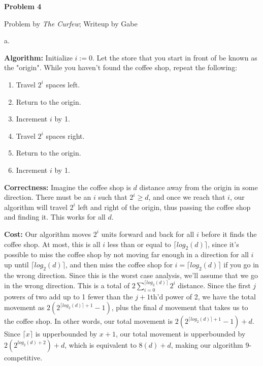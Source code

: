 \documentclass[12pt]{article}
\begin{document}
\begin{center}
\textbf{Problem 4}

Problem by \textit{The Curfew}; Writeup by Gabe
\end{center}

a.

\noindent \textbf{Algorithm:} Initialize $i := 0$. Let the store that you start in front of be known as the "origin". While you haven't found the coffee shop, repeat the following:

\begin{enumerate}

\item Travel $2^i$ spaces left.

\item Return to the origin.

\item Increment $i$ by 1.

\item Travel $2^i$ spaces right.

\item Return to the origin.

\item Increment $i$ by 1.

\end{enumerate}

\noindent \textbf{Correctness:} Imagine the coffee shop is $d$ distance away from the origin in some direction. There must be an $i$ such that $2^i \geq d$, and once we reach that $i$, our algorithm will travel $2^i$ left and right of the origin, thus passing the coffee shop and finding it. This works for all $d$.

\noindent \textbf{Cost:} Our algorithm moves $2^i$ units forward and back for all $i$ before it finds the coffee shop. At most, this is all $i$ less than or equal to $\lceil log_2(d) \rceil$, since it's possible to miss the coffee shop by not moving far enough in a direction for all $i$ up until $\lceil log_2(d) \rceil$, and then miss the coffee shop for $i = \lceil log_2(d) \rceil$ if you go in the wrong direction. Since this is the worst case analysis, we'll assume that we go in the wrong direction. This is a total of $2\sum_{i=0}^{\lceil log_2(d) \rceil} 2^i$ distance. Since the first $j$ powers of two add up to 1 fewer than the $j+1$th'd power of 2, we have the total movement as $2(2^{\lceil log_2(d) \rceil+1}-1)$, plus the final $d$ movement that takes us to the coffee shop. In other words, our total movement is $2(2^{\lceil log_2(d) \rceil+1}-1)+d$. Since $\lceil x \rceil$ is upperbounded by $x+1$, our total movement is upperbounded by $2(2^{log_2(d)+2})+d$, which is equivalent to $8(d)+d$, making our algorithm 9-competitive.
\end{document}
